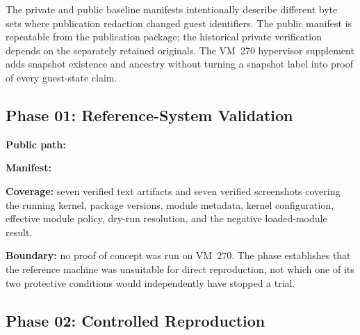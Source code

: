The private and public baseline manifests intentionally describe different
byte sets where publication redaction changed guest identifiers. The public
manifest is repeatable from the publication package; the historical private
verification depends on the separately retained originals. The VM~270
hypervisor supplement adds snapshot existence and ancestry without turning a
snapshot label into proof of every guest-state claim.

\subsection{Phase 01: Reference-System Validation}
\label{app:evidence-phase01}

\begin{evidencebox}
\textbf{Public path:} 

\textbf{Manifest:}

\textbf{Coverage:} seven verified text artifacts and seven verified
screenshots covering the running kernel, package versions, module metadata,
kernel configuration, effective module policy, dry-run resolution, and the
negative loaded-module result.

\textbf{Boundary:} no proof of concept was run on VM~270. The phase establishes
that the reference machine was unsuitable for direct reproduction, not which
one of its two protective conditions would independently have stopped a trial.
\end{evidencebox}

\clearpage

\subsection{Phase 02: Controlled Reproduction}
\label{app:evidence-phase02}

